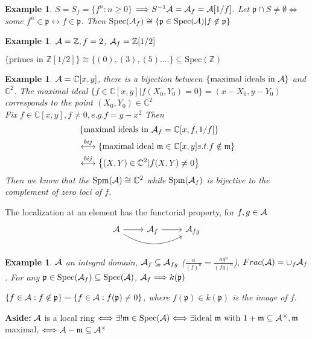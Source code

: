 \documentclass[11pt]{article}
\newtheorem{ex}[thm]{Example}
\newcommand{\cplx}{\mathbb C}
\newcommand{\intg}{\mathbb Z}
\newcommand{\scm}{{\mathfrak m}}
\newcommand{\scp}{{\mathfrak p}}
\newcommand{\cala}{{\cal A}}
\newcommand{\Lrta}{\Longrightarrow}
\newcommand{\Llrta}{\Longleftrightarrow}
\begin{document}
\begin{ex}
$S=S_f=\{f^n:n\geq0\}$
$\Lrta S^{-1}\cala=\cala_f=\cala[1/f]$. Let $\scp\cap S\neq \emptyset\Llrta$ some $f^n\in \scp\leftrightarrow f\in \scp$.
Then $\text{Spec}(\cala_f)\cong \{\scp\in \text{Spec}(\cala)|f\notin \scp\}$
\end{ex}

\begin{ex}
$\cala=\intg,f=2$, $\cala_f=\intg[1/2]$

$\{\text{primes in }\intg[1/2]\}\cong \{(0),(3),(5)....\}\subseteq\text{Spec}(\intg)$
\end{ex}

\begin{ex}
$\cala=\cplx[x,y]$, there is a bijection between $\{\text{maximal ideals in }\cala\}$ and $\cplx^2$.
The maximal ideal $\{f\in \cplx[x,y]| f(X_0,Y_0)=0\}=(x-X_0, y-Y_0)$ corresponds to the point $(X_0,Y_0)\in \cplx^2$\\
Fix $f\in \cplx[x,y], f\neq 0, e.g. f=y-x^2$
Then 
$$
\begin{aligned}
&\left\{ \text{maximal ideals in  }\cala_f=\cplx[x,f,1/f]\right\}\\
&\overset{bij}{\longleftrightarrow} \left\{\text{maximal ideal }\scm\in \cplx[x,y] s.t. f\notin \scm\right\}\\
& \overset{bij}{\longleftrightarrow}\left\{(X,Y)\in \cplx^2|f(X,Y)\neq 0\right\}
\end{aligned}
$$
Then we know that the $\text{Spm}(\cala)\cong \cplx^2$ while $\text{Spm}(\cala_f)$ is bijective to the complement of zero loci of $f$.
\end{ex}


The localization at an element has the functorial property, for $f,g\in\cala$
\[
\begin{tikzcd}
\cala\ar[r]\ar[rr,bend right]&\cala_f\ar[r]&\cala_{fg}  
\end{tikzcd}
\] 


\begin{ex}
$\cala$ an integral domain, $\cala_f\subseteq \cala_{fg}$ ($\frac{a}{(f)^n}=\frac{a g^n}{(fg)^n}$), $Frac(\cala)=\cup_f\cala_f$. For any $\scp\in \text{Spec}(\cala_f)\subseteq\text{Spec}(\cala)$, $\cala_f\Lrta k(\scp)$ 

$\{f\in \cala:f\notin \scp\}=\{f\in \cala:f(\scp)\neq 0\}$, where $f(\scp)\in k(\scp)$ is the image of $f$.
\end{ex}

\textbf{Aside:} $\cala$ is a local ring  $\Llrta\exists !\scm\in \text{Spec}(\cala)\Llrta \exists \text{ideal }\scm\text{ with }1+\scm\subseteq \cala^\times, \scm$ maximal,
$\Llrta \cala-\scm\subseteq \cala^\times$
\end{document}
